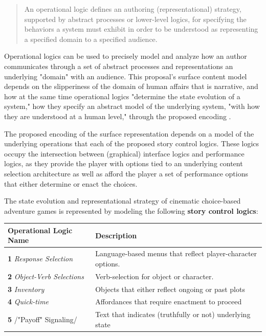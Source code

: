 \documentclass{llncs}
\begin{document}
\begin{quote}
An operational logic defines an authoring (representational)
strategy, supported by abstract processes or lower-level logics, for
specifying the behaviors a system must exhibit in order to be
understood as representing a specified domain to a specified
audience. \cite{Mateas2009b}
\end{quote}

Operational logics can be used to precisely model and analyze how an
author communicates through a set of abstract processes and
representations an underlying "domain" with an audience. This
proposal's surface content model depends on the slipperiness of the
domain of human affairs that is narrative, and how at the same time
operational logics "determine the state evolution of a system," how
they specify an abstract model of the underlying system, "with how
they are understood at a human level," through the proposed encoding
\cite{Mateas2009b}. 

The proposed encoding of the surface representation depends on a model
of the underlying operations that each of the proposed story control
logics. These logics occupy the intersection between (graphical)
interface logics and performance logics, as they provide the player
with options tied to an underlying content selection architecture as
well as afford the player a set of performance options that either
determine or enact the choices.

The state evolution and representational strategy of cinematic
choice-based adventure games is represented by modeling the following
\textbf{story control logics}:

\begin{center}
\begin{tabular}{ll}
Operational Logic Name & Description\\
\hline
\textbf{1} \emph{Response Selection} & Language-based menus that reflect player-character options.\\
\textbf{2} \emph{Object-Verb Selections} & Verb-selection for object or character.\\
\textbf{3} \emph{Inventory} & Objects that either reflect ongoing or past plots\\
\textbf{4} \emph{Quick-time} & Affordances that require enactment to proceed\\
\textbf{5} /"Payoff" Signaling/ & Text that indicates (truthfully or not) underlying state\\
\end{tabular}
\end{center}
\end{document}
